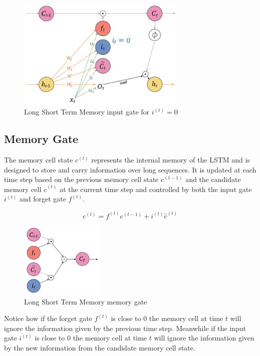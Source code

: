 \begin{figure}[h]
    \centering
    \includegraphics[width=8cm]{Images/lstm-input-gate-i0.png}
    \caption{Long Short Term Memory input gate for $i^{(t)} = 0$}
    \label{fig:lstm-input-gate-i0}
\end{figure}

\subsection{Memory Gate}

The memory cell state $c^{(t)}$ represents the internal memory of the LSTM and is designed to store and carry information over long sequences. It is updated at each time step based on the previous memory cell state $c^{(t-1)}$ and the candidate memory cell $\hat{c}^{(t)}$ at the current time step and controlled by both the input gate $i^{(t)}$ and forget gate $f^{(t)}$.

$$ c^{(t)} = f^{(t)} c^{(t-1)} + i^{(t)} \hat{c}^{(t)}$$

\begin{figure}[h]
    \centering
    \includegraphics[width=4cm]{Images/lstm-memory-gate.png}
    \caption{Long Short Term Memory memory gate}
    \label{fig:lstm-memory-gate}
\end{figure}

\noindent Notice how if the forget gate $f^{(t)}$ is close to 0 the memory cell at time $t$ will ignore the information given by the previous time step. Meanwhile if the input gate $i^{(t)}$ is close to 0 the memory cell at time $t$ will ignore the information given by the new information from the candidate memory cell state. 

